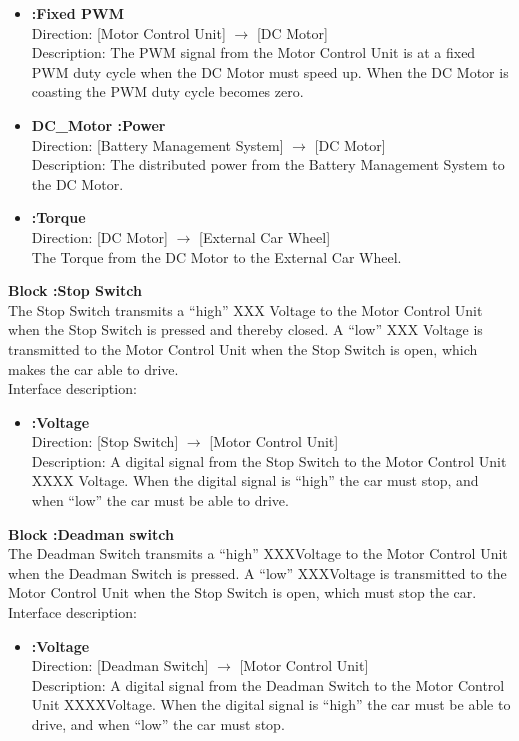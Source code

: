 \begin{itemize}
	\item \textbf{:Fixed PWM}\\
		Direction: [Motor Control Unit] $\rightarrow$ [DC Motor]\\
		Description: The PWM signal from the Motor Control Unit is at a fixed PWM duty cycle when the DC Motor must speed up. When the DC Motor is coasting the PWM duty cycle becomes zero.
	\item \textbf{DC\_Motor :Power}\\
		Direction: [Battery Management System] $\rightarrow$ [DC Motor]\\
		Description: The distributed power from the Battery Management System to the DC Motor.
	\item \textbf{:Torque}\\
		Direction: [DC Motor] $\rightarrow$ [External Car Wheel]\\
		The Torque from the DC Motor to the External Car Wheel.
\end{itemize}

\textbf{Block :Stop Switch}\\
The Stop Switch transmits a “high” XXX Voltage to the Motor Control Unit when the Stop Switch is pressed and thereby closed. A “low” XXX  Voltage is transmitted to the Motor Control Unit when the Stop Switch is open, which makes the car able to drive.\\
Interface description:

\begin{itemize}
	\item \textbf{:Voltage}\\
		Direction: [Stop Switch] $\rightarrow$ [Motor Control Unit]\\
		Description: A digital signal from the Stop Switch to the Motor Control Unit XXXX Voltage. When the digital signal is “high” the car must stop, and when “low” the car must be able to drive.
\end{itemize}

\textbf{Block :Deadman switch}\\
The Deadman Switch transmits a “high” XXXVoltage to the Motor Control Unit when the Deadman Switch is pressed. A “low” XXXVoltage is transmitted to the Motor Control Unit when the Stop Switch is open, which must stop the car.
Interface description:

\begin{itemize}
	\item \textbf{:Voltage}\\
		Direction: [Deadman Switch] $\rightarrow$ [Motor Control Unit]\\
		Description: A digital signal from the Deadman Switch to the Motor Control Unit XXXXVoltage. When the digital signal is “high” the car must be able to drive, and when “low” the car must stop.
\end{itemize}

